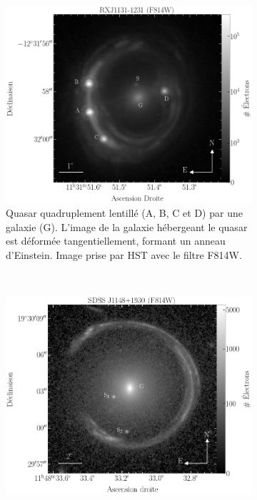 \begin{figure}[tb!]
        \centering
        \begin{subfigure}[t]{0.45\textwidth}
                \includegraphics[width=\linewidth]{figures/rxj1131} 
                \caption{Quasar quadruplement lentillé (A, B, C et D) par une galaxie (G). L'image de la galaxie hébergeant le quasar 
                        est déformée tangentiellement, formant un anneau d'Einstein. Image prise par HST avec le filtre F814W.}
                \label{fig:rxj1131}
        \end{subfigure}
        ~
        \begin{subfigure}[t]{0.45\textwidth}
                \includegraphics[width=\linewidth]{figures/sdssj1148} 

\end{subfigure}
\end{figure}
